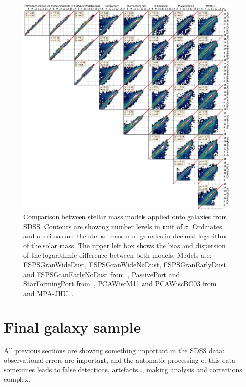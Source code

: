 \begin{figure}[htb]
    \centering
    \includegraphics[width=\linewidth]{figures/sdss/stellar_mass_models.pdf}
    \caption{Comparison between stellar mass models applied onto galaxies from
        SDSS\@. Contours are showing number levels in unit of $\sigma$.
        Ordinates and abscissas are the stellar masses of galaxies in decimal
        logarithm of the solar mass. The upper left box shows the bias and
        dispersion of the logarithmic difference between both models. Models
        are: FSPSGranWideDust, FSPSGranWideNoDust, FSPSGranEarlyDust and
        FSPSGranEarlyNoDust from~\cite{Conroy+09}, PassivePort and
        StarFormingPort from~\cite{Maraston+09}, PCAWiscM11 and PCAWiscBC03
    from~\cite{Chen+12} and MPA-JHU~\citep{Brinchmann+04, Kauffmann+03,
Tremonti+04}.\label{fig:stellar_mass_models}}
\end{figure}

\section{Final galaxy sample}
\label{sec:final_galaxy_sample}

All previous sections are showing something important in the SDSS data:
observational errors are important, and the automatic processing of this data
sometimes leads to false detections, artefacts\ldots, making analysis and
corrections complex.


